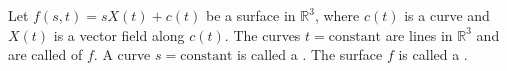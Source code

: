 Let $f(s, t) = s X(t) + c(t)$ be a surface in $\mathbb{R}^3$, where $c(t)$ is a curve and $X(t)$ is a vector field along $c(t)$. The curves $t = \text{constant}$ are lines in $\mathbb{R}^3$ and are called  of $f$. A curve $s = \text{constant}$ is called a . The surface $f$ is called a .
